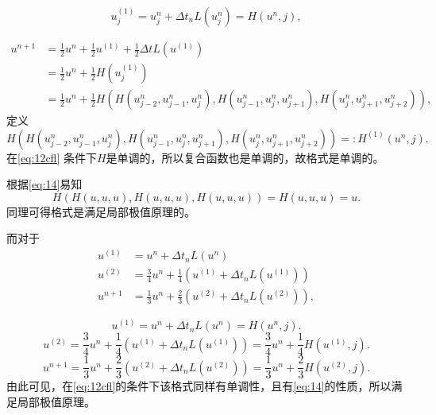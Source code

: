 \documentclass[12pt]{article}
\begin{document}
\begin{equation}
	u^{(1)}_j  =u^{n}_j +\Delta t_{n} L\left(u^{n}_j \right) = H(u^n,j),
\end{equation}

\begin{equation}
	\begin{aligned}
		u^{n+1} & =\frac{1}{2} u^{n}+\frac{1}{2} u^{(1)}+\frac{1}{2} \Delta t L\left(u^{(1)}\right)                                                                                                                        \\
		        & =\frac{1}{2} u^{n}+\frac{1}{2}H\left(u^{(1)}_j\right)                                                                                                                                                    \\
		        & =  \frac{1}{2} u^{n}+ \frac{1}{2} H\left(H\left(u_{j-2}^{n}, u_{j-1}^{n}, u_{j}^{n}\right), H\left(u_{j-1}^{n}, u_{j}^{n}, u_{j+1}^{n}\right), H\left(u_{j}^{n}, u_{j+1}^{n}, u_{j+2}^{n}\right)\right),
	\end{aligned}
\end{equation}
定义
\begin{equation}
	H\left(H\left(u_{j-2}^{n}, u_{j-1}^{n}, u_{j}^{n}\right), H\left(u_{j-1}^{n}, u_{j}^{n}, u_{j+1}^{n}\right), H\left(u_{j}^{n}, u_{j+1}^{n}, u_{j+2}^{n}\right)\right) =: H^{(1)}\left(u^n,j\right).
\end{equation}
在\cref{eq:12cfl} 条件下$H$是单调的，所以复合函数也是单调的，故格式是单调的。

根据\cref{eq:14}易知
\begin{equation}
	H\left(H(u,u,u),H(u,u,u),H(u,u,u)\right) = H(u,u,u) = u.
\end{equation}
同理可得格式是满足局部极值原理的。

而对于
\begin{align}
	u^{(1)} & =u^{n}+\Delta t_{n} L\left(u^{n}\right)                                                \\
	u^{(2)} & =\frac{3}{4} u^{n}+\frac{1}{4}\left(u^{(1)}+\Delta t_{n} L\left(u^{(1)}\right)\right)  \\
	u^{n+1} & =\frac{1}{3} u^{n}+\frac{2}{3}\left(u^{(2)}+\Delta t_{n} L\left(u^{(2)}\right)\right),
\end{align}

\begin{equation}
	u^{(1)} =u^{n}+\Delta t_{n} L\left(u^{n}\right)=H\left(u^n,j\right).
\end{equation}
\begin{equation}
	u^{(2)} =\frac{3}{4} u^{n}+\frac{1}{4}\left(u^{(1)}+\Delta t_{n} L\left(u^{(1)}\right)\right)=\frac{3}{4} u^{n}+\frac{1}{4}H\left(u^{(1)},j\right).
\end{equation}
\begin{equation}
	u^{n+1} =\frac{1}{3} u^{n}+\frac{2}{3}\left(u^{(2)}+\Delta t_{n} L\left(u^{(2)}\right)\right) = \frac{1}{3} u^{n}+\frac{2}{3}H\left(u^{(2)},j\right).
\end{equation}
由此可见，在\cref{eq:12cfl}的条件下该格式同样有单调性，且有\cref{eq:14}的性质，所以满足局部极值原理。
\end{document}
